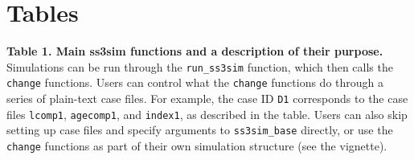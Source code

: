 \documentclass[10pt]{article}
\begin{document}
\clearpage

\section*{Tables}

\textbf{Table 1. Main ss3sim functions and a description of their purpose.}
Simulations can be run through the \texttt{run\_ss3sim} function, which then
calls the \texttt{change} functions. Users can control what the \texttt{change}
functions do through a series of plain-text case files. For example, the case
ID \texttt{D1} corresponds to the case files \texttt{lcomp1},
\texttt{agecomp1}, and \texttt{index1}, as described in the table. Users can
also skip setting up case files and specify arguments to \texttt{ss3sim\_base}
directly, or use the \texttt{change} functions as part of their own simulation
structure (see the vignette).
\end{document}
